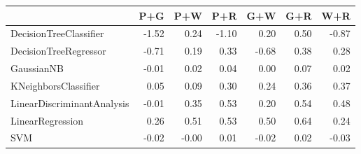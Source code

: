 \begin{tabular}{lrrrrrr}
\toprule
{} &   P+G &   P+W &   P+R &   G+W &   G+R &   W+R \\
\midrule
DecisionTreeClassifier     & -1.52 &  0.24 & -1.10 &  0.20 &  0.50 & -0.87 \\
DecisionTreeRegressor      & -0.71 &  0.19 &  0.33 & -0.68 &  0.38 &  0.28 \\
GaussianNB                 & -0.01 &  0.02 &  0.04 &  0.00 &  0.07 &  0.02 \\
KNeighborsClassifier       &  0.05 &  0.09 &  0.30 &  0.24 &  0.36 &  0.37 \\
LinearDiscriminantAnalysis & -0.01 &  0.35 &  0.53 &  0.20 &  0.54 &  0.48 \\
LinearRegression           &  0.26 &  0.51 &  0.53 &  0.50 &  0.64 &  0.24 \\
SVM                        & -0.02 & -0.00 &  0.01 & -0.02 &  0.02 & -0.03 \\
\bottomrule
\end{tabular}
